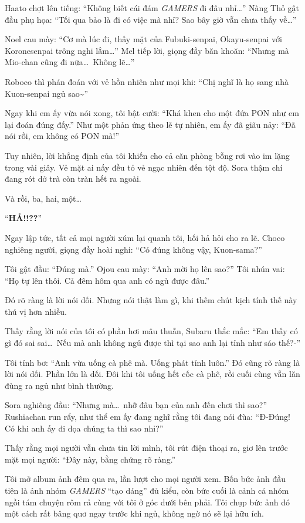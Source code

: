 \documentclass[../main.tex]{subfiles}
\begin{document}
Haato chợt lên tiếng: ``Không biết cái đám \textit{GAMERS} đi đâu nhỉ\dots'' Nàng Thỏ gật đầu phụ họa: ``Tối qua bảo là đi có việc mà nhỉ? Sao bây giờ vẫn chưa thấy về\dots''

Noel cau mày: ``Cơ mà lúc đi, thấy mặt của Fubuki-senpai, Okayu-senpai với Koronesenpai trông nghi lắm\dots'' Mel tiếp lời, giọng đầy băn khoăn: ``Nhưng mà Mio-chan cũng đi nữa\dots\ Không lẽ\dots''

Roboco thì phán đoán với vẻ hồn nhiên như mọi khi: ``Chị nghĩ là họ sang nhà Kuon-senpai ngủ sao\~{}''

Ngay khi em ấy vừa nói xong, tôi bật cười: ``Khá khen cho một đứa PON như em lại đoán đúng đấy.'' Như một phản ứng theo lẽ tự nhiên, em ấy đã giãu nảy: ``Đã nói rồi, em không có PON mà!''

Tuy nhiên, lời khẳng định của tôi khiến cho cả căn phòng bỗng rơi vào im lặng trong vài giây. Vẻ mặt ai nấy đều tỏ vẻ ngạc nhiên đến tột độ. Sora thậm chí đang rót dở trà còn tràn hết ra ngoài.

Và rồi, ba, hai, một\dots

``\textbf{HẢ!!??}''

Ngay lập tức, tất cả mọi người xúm lại quanh tôi, hối hả hỏi cho ra lẽ. Choco nghiêng người, giọng đầy hoài nghi: ``Có đúng không vậy, Kuon-sama?''

Tôi gật đầu: ``Đúng mà.'' Ojou cau mày: ``Anh mời họ lên sao?'' Tôi nhún vai: ``Họ tự lên thôi. Cả đêm hôm qua anh có ngủ được đâu.''

Đó rõ ràng là lời nói dối. Nhưng nói thật làm gì, khi thêm chút kịch tính thế này thú vị hơn nhiều.

Thấy rằng lời nói của tôi có phần hơi mâu thuẫn, Subaru thắc mắc: ``Em thấy có gì đó sai sai\dots\ Nếu mà anh không ngủ được thì tại sao anh lại tỉnh như sáo thế?-''

Tôi tỉnh bơ: ``Anh vừa uống cà phê mà. Uống phát tỉnh luôn.'' Đó cũng rõ ràng là lời nói dối. Phần lớn là dối. Đôi khi tôi uống hết cốc cà phê, rồi cuối cùng vẫn lăn đùng ra ngủ như bình thường.

Sora nghiêng đầu: ``Nhưng mà\dots\ nhỡ đâu bạn của anh đến chơi thì sao?'' Rushiachan run rẩy, như thể em ấy đang nghĩ rằng tôi đang nói đùa: ``Đ-Đúng! Có khi anh ấy đi dọa chúng ta thì sao nhỉ?''

Thấy rằng mọi người vẫn chưa tin lời mình, tôi rút điện thoại ra, giơ lên trước mặt mọi người: ``Đây này, bằng chứng rõ ràng.''

Tôi mở album ảnh đêm qua ra, lần lượt cho mọi người xem. Bốn bức ảnh đầu tiên là ảnh nhóm \textit{GAMERS} ``tạo dáng'' đủ kiểu, còn bức cuối là cảnh cả nhóm ngồi tám chuyện rôm rả cùng với tôi ở góc dưới bên phải. Tôi chụp bức ảnh đó một cách rất bâng quơ ngay trước khi ngủ, không ngờ nó sẽ lại hữu ích.
\end{document}
